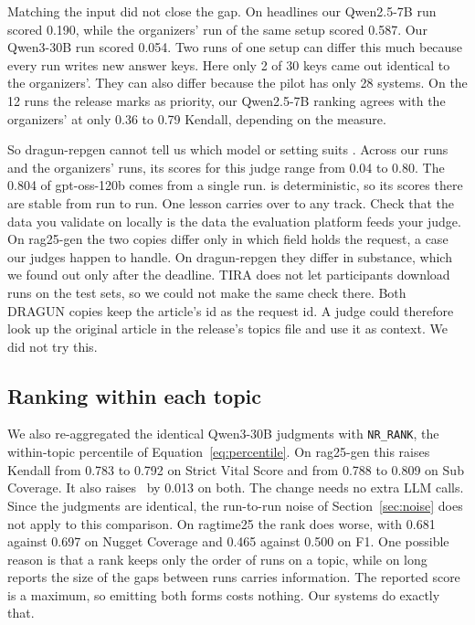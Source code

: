 Matching the input did not close the gap. On headlines our Qwen2.5-7B run scored
0.190, while the organizers' run of the same setup scored 0.587. Our Qwen3-30B
run scored 0.054. Two runs of one setup can differ this much because every run
writes new answer keys. Here only 2 of 30 keys came out identical to the
organizers'. They can also differ because the pilot has only 28 systems. On the 12
runs the release marks as priority, our Qwen2.5-7B ranking agrees with the
organizers' at only 0.36 to 0.79 Kendall, depending on the measure.

So dragun-repgen cannot tell us which model or setting suits .
Across our runs and the organizers' runs, its scores for this judge range from 0.04
to 0.80. The 0.804 of gpt-oss-120b comes from a single run.  is
deterministic, so its scores there are stable from run to run. One lesson carries
over to any track. Check that the data you validate on locally is the data the
evaluation platform feeds your judge. On rag25-gen the two copies differ only in
which field holds the request, a case our judges happen to handle. On
dragun-repgen they differ in substance, which we found out only after the deadline.
TIRA does not let participants download runs on the test sets, so we could not make the
same check there. Both DRAGUN copies keep the article's id as the request id. A
judge could therefore look up the original article in the release's topics file
and use it as context. We did not try this.

\subsection{Ranking within each topic}

We also re-aggregated the identical Qwen3-30B judgments with \texttt{NR\_RANK}, the within-topic percentile of Equation~\ref{eq:percentile}. On rag25-gen this raises Kendall from 0.783 to 0.792 on Strict Vital Score
and from 0.788 to 0.809 on Sub Coverage. It also raises \tauap\ by 0.013 on both.
The change needs no extra LLM calls. Since the judgments are identical, the
run-to-run noise of Section~\ref{sec:noise} does not apply to this comparison.
On ragtime25 the rank does worse, with 0.681 against 0.697 on Nugget Coverage
and 0.465 against 0.500 on F1. One possible reason is that a rank keeps only the
order of runs on a topic, while on long reports the size of the gaps between runs carries information. The
reported score is a maximum, so emitting both forms costs nothing. Our
 systems do exactly that.

